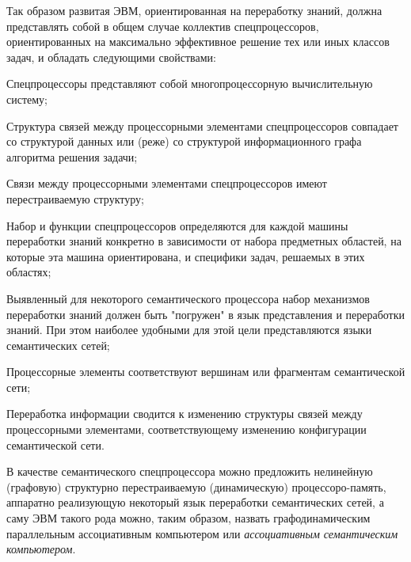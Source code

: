 Так образом развитая ЭВМ, ориентированная на переработку знаний, должна представлять собой в общем случае коллектив спецпроцессоров, ориентированных на максимально эффективное решение тех или иных классов задач, и обладать следующими свойствами:
\begin{textitemize}
\item Спецпроцессоры представляют собой многопроцессорную вычислительную систему;
\item Структура связей между процессорными элементами спецпроцессоров совпадает со структурой данных или (реже) со структурой информационного графа алгоритма решения задачи;
\item Связи между процессорными элементами спецпроцессоров имеют перестраиваемую структуру;
\item Набор и функции спецпроцессоров определяются для каждой машины переработки знаний конкретно в зависимости от набора предметных областей, на которые эта машина ориентирована, и специфики задач, решаемых в этих областях;
\item Выявленный для некоторого семантического процессора набор механизмов переработки знаний должен быть "погружен"{} в язык представления и переработки знаний. При этом наиболее удобными для этой цели представляются языки семантических сетей;
\item Процессорные элементы соответствуют вершинам или фрагментам семантической сети;
\item Переработка информации сводится к изменению структуры связей между процессорными элементами, соответствующему изменению конфигурации семантической сети.
\end{textitemize}

В качестве семантического спецпроцессора можно предложить нелинейную (графовую) структурно перестраиваемую (динамическую) процессоро-память, аппаратно реализующую некоторый язык переработки семантических сетей, а саму ЭВМ такого рода можно, таким образом, назвать графодинамическим параллельным ассоциативным компьютером или \textit{ассоциативным семантическим компьютером}.

